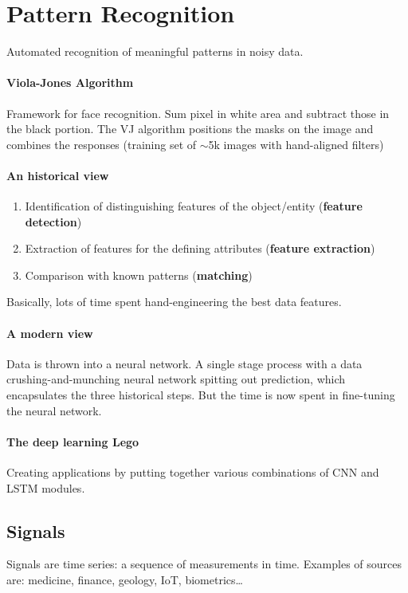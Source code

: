\documentclass[10pt]{report}
\begin{document}
\section{Pattern Recognition}
Automated recognition of meaningful patterns in noisy data.
\paragraph{Viola-Jones Algorithm} Framework for face recognition. Sum pixel in white area and subtract those in the black portion. The VJ algorithm positions the masks on the image and combines the responses (training set of $\sim$5k images with hand-aligned filters)
\paragraph{An historical view} \begin{enumerate}
	\item Identification of distinguishing features of the object/entity (\textbf{feature detection})
	\item Extraction of features for the defining attributes (\textbf{feature extraction})
	\item Comparison with known patterns (\textbf{matching})
\end{enumerate}
Basically, lots of time spent hand-engineering the best data features.
\paragraph{A modern view}
Data is thrown into a neural network. A single stage process with a data crushing-and-munching neural network spitting out prediction, which encapsulates the three historical steps. But the time is now spent in fine-tuning the neural network.
\paragraph{The deep learning Lego} Creating applications by putting together various combinations of CNN and LSTM modules.
\subsection{Signals}
Signals are time series: a sequence of measurements in time. Examples of sources are: medicine, finance, geology, IoT, biometrics\ldots
\end{document}
